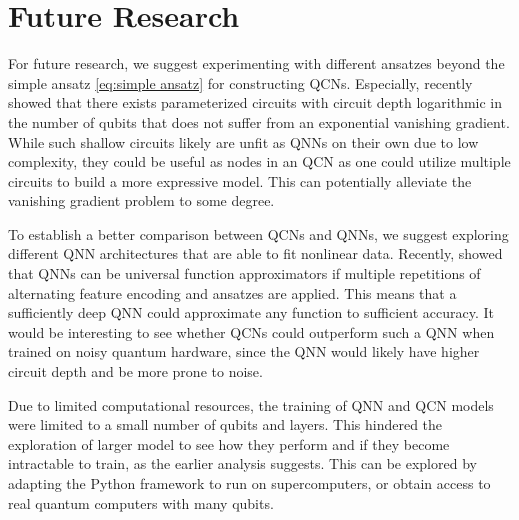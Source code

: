\section{Future Research}\label{sec:future}
For future research, we suggest experimenting with different ansatzes beyond the simple ansatz \cref{eq:simple ansatz} for constructing QCNs. Especially, \citet{Cerezo_2021} recently showed that there exists parameterized circuits with circuit depth logarithmic in the number of qubits that does not suffer from an exponential vanishing gradient. While such shallow circuits likely are unfit as QNNs on their own due to low complexity, they could be useful as nodes in an QCN as one could utilize multiple circuits to build a more expressive model. This can potentially alleviate the vanishing gradient problem to some degree.

To establish a better comparison between QCNs and QNNs, we suggest exploring different QNN architectures that are able to fit nonlinear data. Recently, \citet{Schuld_2021} showed that QNNs can be universal function approximators if multiple repetitions of alternating feature encoding and ansatzes are applied. This means that a sufficiently deep QNN could approximate any function to sufficient accuracy. It would be interesting to see whether QCNs could outperform such a QNN when trained on noisy quantum hardware, since the QNN would likely have higher circuit depth and be more prone to noise.

Due to limited computational resources, the training of QNN and QCN models were limited to a small number of qubits and layers. This hindered the exploration of larger model to see how they perform and if they become intractable to train, as the earlier analysis suggests. This can be explored by adapting the Python framework to run on supercomputers, or obtain access to real quantum computers with many qubits.



